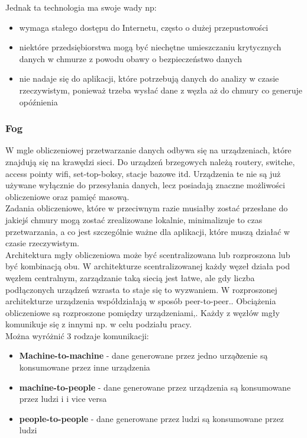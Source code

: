 Jednak ta technologia ma swoje wady np:

\begin{itemize}
	\item wymaga stałego dostępu do Internetu, często o dużej przepustowości
	\item niektóre przedsiębiorstwa mogą być niechętne umieszczaniu krytycznych danych w chmurze z powodu obawy o bezpieczeństwo danych
	\item nie nadaje się do aplikacji, które potrzebują danych do analizy w czasie rzeczywistym, ponieważ trzeba wysłać dane z węzła aż do chmury co generuje opóźnienia \\
\end{itemize}

\subsubsection{Fog}

W mgle obliczeniowej przetwarzanie danych odbywa się na urządzeniach, które znajdują się na krawędzi sieci. Do urządzeń brzegowych należą routery, switche, access pointy wifi,  set-top-boksy, stacje bazowe itd. Urządzenia te nie są już używane wyłącznie do przesyłania danych, lecz posiadają znaczne możliwości obliczeniowe oraz pamięć masową. \\

Zadania obliczeniowe, które w przeciwnym razie musiałby zostać przesłane do jakiejś chmury mogą zostać zrealizowane lokalnie, minimalizuje to czas przetwarzania, a co jest szczególnie ważne dla aplikacji, które muszą działać w czasie rzeczywistym. \\

Architektura mgły obliczeniowa może być scentralizowana lub rozproszona lub być kombinacją obu. W architekturze scentralizowanej każdy węzeł działa pod węzłem centralnym, zarządzanie taką siecią jest łatwe, ale gdy liczba podłączonych urządzeń wzrasta to staje się to wyzwaniem. W rozproszonej architekturze urządzenia współdziałają w sposób peer-to-peer.. Obciążenia obliczeniowe są rozproszone pomiędzy urządzeniami,. Każdy z węzłów mgły komunikuje się z innymi np. w celu podziału pracy. \\

Można wyróżnić 3 rodzaje komunikacji:

\begin{itemize}
	\item \textbf{Machine-to-machine} - dane generowane przez jedno urząðzenie są konsumowane przez inne urządzenia
	\item \textbf{machine-to-people} - dane generowane przez urządzenia są konsumowane przez ludzi i i vice versa
	\item \textbf{people-to-people} - dane generowane przez ludzi są konsumowane przez ludzi \\
\end{itemize}

